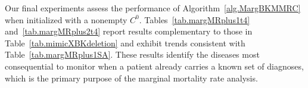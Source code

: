 Our final experiments assess the performance of
Algorithm~\ref{alg.MargBKMMRC} when initialized with a nonempty $C^0$.
Tables~\ref{tab.margMRplus1t4} and~\ref{tab.margMRplus2t4} report
results complementary to those in Table~\ref{tab.mimicXBKdeletion}
and exhibit trends consistent with Table~\ref{tab.margMRplus1SA}.
These results identify the diseases most consequential to monitor when
a patient already carries a known set of diagnoses, which is the
primary purpose of the marginal mortality rate analysis.

\begin{table}[htbp]
\centering
{}
\caption{Top-3 Most Lethal Cliques Formed by the Addition of a Single
Disease}
\label{tab.margMRplus1t4}
\end{table}

